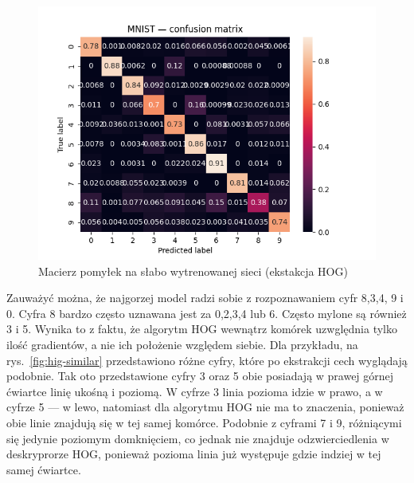 \documentclass[10pt]{article}
\begin{document}
\begin{figure}[H]\centering
    \includegraphics[width=.3\linewidth]{img/mnist_hog_bad_cm.png}
    \caption{Macierz pomyłek na słabo wytrenowanej sieci (ekstakcja HOG)}\label{fig:hog-bad-cm}
\end{figure}

Zauważyć można, że najgorzej model radzi sobie z rozpoznawaniem cyfr 8,3,4, 9 i 0.
Cyfra 8 bardzo często uznawana jest za 0,2,3,4 lub 6.
Często mylone są również 3 i 5.
Wynika to z faktu, że algorytm HOG wewnątrz komórek uzwględnia tylko ilość gradientów, a nie ich położenie względem siebie.
Dla przykładu, na rys.~\ref{fig:hig-similar} przedstawiono różne cyfry, które po ekstrakcji cech wyglądają podobnie.
Tak oto przedstawione cyfry 3 oraz 5 obie posiadają w prawej górnej ćwiartce linię ukośną i poziomą.
W cyfrze 3 linia pozioma idzie w prawo, a w cyfrze 5 --- w lewo, natomiast dla algorytmu HOG nie ma to znaczenia, ponieważ obie linie znajdują się w tej samej komórce.
Podobnie z cyframi 7 i 9, różniącymi się jedynie poziomym domknięciem, co jednak nie znajduje odzwierciedlenia w deskryprorze HOG, ponieważ pozioma linia już występuje gdzie indziej w tej samej ćwiartce.
\end{document}
